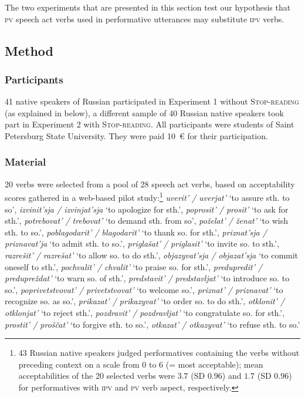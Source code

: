 \documentclass[output=paper,
colorlinks,
citecolor=brown,
newtxmath,
hidelinks
]{langscibook}
\begin{document}
The two experiments that are presented in this section test our hypothesis that \textsc{pv} speech act verbs used in performative utterances may substitute \textsc{ipv} verbs. 

\subsection{Method}

\subsubsection{Participants}

41 native speakers of Russian participated in Experiment 1 without \textsc{Stop-reading} (as explained in  below), a different sample of 40 Russian native speakers took part in Experiment 2 with \textsc{Stop-reading}. All participants were students of Saint Petersburg State University. They were paid 10~{\small\euro} for their participation.

\subsubsection{Material}

20 verbs were selected from a pool of 28 speech act verbs, based on acceptability scores gathered in a web-based pilot study:\footnote{43 Russian native speakers judged performatives containing the verbs without preceding context on a scale from 0 to 6 (= most acceptable); mean acceptabilities of the 20 selected verbs were $3.7$ (SD $0.96$) and $1.7$ (SD $0.96$) for performatives with \textsc{ipv} and \textsc{pv} verb aspect, respectively.} 
\textit{uverit' / uverjat'} ‘to assure sth. to so’, 
\textit{izvinit'sja / izvinjat'sja} ‘to apologize for sth.’, 
\textit{poprosit' / prosit'} ‘to ask for sth.’, 
\textit{potrebovat' / trebovat'} ‘to demand sth. from so’, 
\textit{poželat' / ženat'} ‘to wish sth. to so.’, 
\textit{poblagodarit' / blagodarit'} ‘to thank so. for sth.’, 
\textit{priznat'sja / priznavat'ja} ‘to admit sth. to so.’, 
\textit{priglašat' / priglasit'} ‘to invite so. to sth.’, 
\textit{razrešit' / razrešat'} ‘to allow so. to do sth.’, 
\textit{objazyvat'sja / objazat'sja} ‘to commit oneself to sth.’, 
\textit{pochvalit' / chvalit'} ‘to praise so. for sth.’, 
\textit{predupredit' / predupreždat'} ‘to warn so. of sth.’, 
\textit{predstavit' / predstavljat'} ‘to introduce so. to so.’, \textit{poprivetstvovat' / privetstvovat'} ‘to welcome so.’, 
\textit{priznat' / priznavat'} ‘to recognize so. as so.’, 
\textit{prikazat' / prikazyvat'} ‘to order so. to do sth.’, 
\textit{otklonit' / otklonjat'} ‘to reject sth.’, 
\textit{pozdravit' / pozdravljat'} ‘to congratulate so. for sth.’, 
\textit{prostit' / proščat'} ‘to forgive sth. to so.’, 
\textit{otkazat' / otkazyvat'} ‘to refuse sth. to so.’
\end{document}
